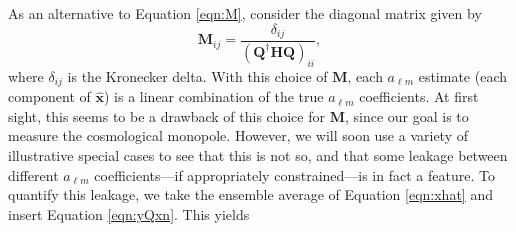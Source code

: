 \documentclass[twocolumn,apj,numberedappendix]{emulateapj}
\newcommand{\y}{\mathbf{y}}
\newcommand{\N}{\mathbf{N}}
\newcommand{\Hmat}{\mathbf{H}}
\newcommand{\Q}{\mathbf{Q}}
\newcommand{\M}{\mathbf{M}}
\begin{document}
As an alternative to Equation \eqref{eqn:M}, consider the diagonal matrix given by 
\begin{equation}
\label{eq:diagM}
\M_{ij} = \frac{\delta_{ij}}{(\Q^\dagger \Hmat \Q)_{ii}},
\end{equation}
where $\delta_{ij}$ is the Kronecker delta. With this choice of $\M$, each $a_{\ell m}$ estimate (each component of $\hat{\mathbf{x}}$) is a linear combination of the true $a_{\ell m}$ coefficients. At first sight, this seems to be a drawback of this choice for $\M$, since our goal is to measure the cosmological monopole. However, we will soon use a variety of illustrative special cases to see that this is not so, and that some leakage between different $a_{\ell m}$ coefficients---if appropriately constrained---is in fact a feature. To quantify this leakage, we take the ensemble average of Equation \eqref{eqn:xhat} and insert Equation \eqref{eqn:yQxn}. This yields
%
%
%
\end{document}
